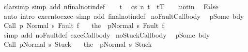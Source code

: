 \begin{isabellebody}
\isamarkupfalse%
\ {\isacharparenleft}clarsimp\ simp\ add{\isacharcolon}\ nfinal{\isacharunderscore}notin{\isacharunderscore}def{\isacharparenright}\isanewline
\ \ \isamarkupfalse%
\ t\ \isamarkupfalse%
\ {\isachardoublequoteopen}{\isasymGamma}{\isasymturnstile}{\isasymlangle}c{\isacharcomma}s{\isasymrangle}\ {\isacharequal}n{\isasymRightarrow}\ t{\isachardoublequoteclose}\ \ {\isachardoublequoteopen}t{\isasymin}T{\isachardoublequoteclose}\isanewline
\ \ \isamarkupfalse%
\ notin\ \isamarkupfalse%
\ {\isachardoublequoteopen}False{\isachardoublequoteclose}\isanewline
\ \ \ \ \isamarkupfalse%
\ {\isacharparenleft}auto\ intro{\isacharcolon}\ execn{\isacharunderscore}to{\isacharunderscore}exec\ simp\ add{\isacharcolon}\ final{\isacharunderscore}notin{\isacharunderscore}def{\isacharparenright}\isanewline
{}\isamarkupfalse%
%
\endisatagproof
{\isafoldproof}%
%
\isadelimproof
\isanewline
%
\endisadelimproof
\isanewline
{}\isamarkupfalse%
\ noFault{\isacharunderscore}Call{\isacharunderscore}body{\isacharcolon}\ \isanewline
{\isachardoublequoteopen}{\isasymGamma}\ p{\isacharequal}Some\ bdy{\isasymLongrightarrow}\isanewline
\ {\isasymGamma}{\isasymturnstile}{\isasymlangle}Call\ p\ {\isacharcomma}Normal\ s{\isasymrangle}\ {\isasymRightarrow}{\isasymnotin}{\isacharbraceleft}Fault\ f{\isacharbraceright}\ {\isacharequal}\ \isanewline
\ {\isasymGamma}{\isasymturnstile}{\isasymlangle}the\ {\isacharparenleft}{\isasymGamma}\ p{\isacharparenright}{\isacharcomma}Normal\ s{\isasymrangle}\ {\isasymRightarrow}{\isasymnotin}{\isacharbraceleft}Fault\ f{\isacharbraceright}{\isachardoublequoteclose}\isanewline
%
\isadelimproof
\ \ %
\endisadelimproof
%
\isatagproof
{}\isamarkupfalse%
\ {\isacharparenleft}simp\ add{\isacharcolon}\ noFault{\isacharunderscore}def{\isacharprime}\ exec{\isacharunderscore}Call{\isacharunderscore}body{\isacharparenright}%
\endisatagproof
{\isafoldproof}%
%
\isadelimproof
\isanewline
%
\endisadelimproof
\isanewline
{}\isamarkupfalse%
\ noStuck{\isacharunderscore}Call{\isacharunderscore}body{\isacharcolon}\ \isanewline
{\isachardoublequoteopen}{\isasymGamma}\ p{\isacharequal}Some\ bdy{\isasymLongrightarrow}\isanewline
\ {\isasymGamma}{\isasymturnstile}{\isasymlangle}Call\ p{\isacharcomma}Normal\ s{\isasymrangle}\ {\isasymRightarrow}{\isasymnotin}{\isacharbraceleft}Stuck{\isacharbraceright}\ {\isacharequal}\ \isanewline
\ {\isasymGamma}{\isasymturnstile}{\isasymlangle}the\ {\isacharparenleft}{\isasymGamma}\ p{\isacharparenright}{\isacharcomma}Normal\ s{\isasymrangle}\ {\isasymRightarrow}{\isasymnotin}{\isacharbraceleft}Stuck{\isacharbraceright}{\isachardoublequoteclose}\isanewline

\end{isabellebody}
